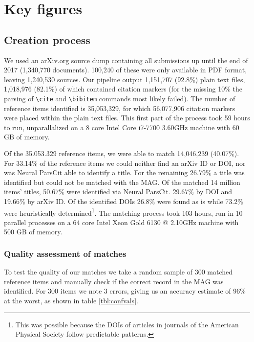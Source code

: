 \section{Key figures}
\subsection{Creation process}
We used an arXiv.org source dump containing all submissions up until the end of 2017 (1,340,770 documents). 100,240 of these were only available in PDF format, leaving 1,240,530 sources. Our pipeline output 1,151,707 (92.8\%) plain text files, 1,018,976 (82.1\%) of which contained citation markers (for the missing 10\% the parsing of \texttt{\textbackslash cite} and \texttt{\textbackslash bibitem} commands most likely failed). The number of reference items identified is 35,053,329, for which 56,077,906 citation markers were placed within the plain text files. This first part of the process took 59 hours to run, unparallalized on a 8 core Intel Core i7-7700 3.60GHz machine with 60 GB of memory.

Of the 35.053.329 reference items, we were able to match 14,046,239 (40.07\%). For 33.14\% of the reference items we could neither find an arXiv ID or DOI, nor was Neural ParsCit able to identify a title. For the remaining 26.79\% a title was identified but could not be matched with the MAG. Of the matched 14 million items' titles, 50.67\% were identified via Neural ParsCit. 29.67\% by DOI and 19.66\% by arXiv ID. Of the identified DOIs 26.8\% were found as is while 73.2\% were heuristically determined\footnote{This was possible because the DOIs of articles in journals of the American Physical Society follow predictable patterns.}. The matching process took 103 hours, run in 10 parallel processes on a 64 core Intel Xeon Gold 6130 @ 2.10GHz machine with 500 GB of memory.

\subsubsection{Quality assessment of matches} To test the quality of our matches we take a random sample of 300 matched reference items and manually check if the correct record in the MAG was identified. For 300 items we note 3 errors, giving us an accuracy estimate of 96\% at the worst, as shown in table \ref{tbl:confvals}.

